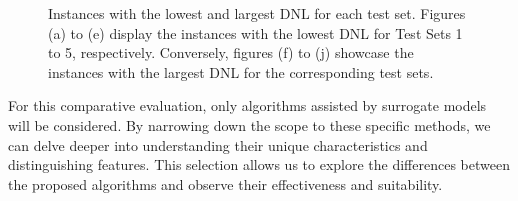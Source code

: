 \begin{figure}
				 \hspace{.01\textwidth}
				 \hspace{.01\textwidth}
				\caption[Instances with the lowest and largest degree of non-linearity for each test set.]{Instances with the lowest and largest DNL for each test set. Figures (a) to (e) display the instances with the lowest DNL for Test Sets 1 to 5, respectively. Conversely, figures (f) to (j) showcase the instances with the largest DNL for the corresponding test sets.}
				\label{fig:results:benchmark:instances}
			\end{figure}
		
			
			For this comparative evaluation, only algorithms assisted by surrogate models will be considered. By narrowing down the scope to these specific methods, we can delve deeper into understanding their unique characteristics and distinguishing features. This selection allows us to explore the differences between the proposed algorithms and observe their effectiveness and suitability.
			
